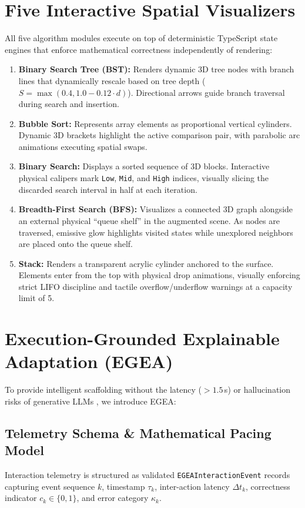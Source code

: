 \documentclass[conference]{IEEEtran}
\begin{document}
\section{Five Interactive Spatial Visualizers}
All five algorithm modules execute on top of deterministic TypeScript state engines that enforce mathematical correctness independently of rendering:
\begin{enumerate}
    \item \textbf{Binary Search Tree (BST):} Renders dynamic 3D tree nodes with branch lines that dynamically rescale based on tree depth ($S = \max(0.4, 1.0 - 0.12 \cdot d)$). Directional arrows guide branch traversal during search and insertion.
    \item \textbf{Bubble Sort:} Represents array elements as proportional vertical cylinders. Dynamic 3D brackets highlight the active comparison pair, with parabolic arc animations executing spatial swaps.
    \item \textbf{Binary Search:} Displays a sorted sequence of 3D blocks. Interactive physical calipers mark \texttt{Low}, \texttt{Mid}, and \texttt{High} indices, visually slicing the discarded search interval in half at each iteration.
    \item \textbf{Breadth-First Search (BFS):} Visualizes a connected 3D graph alongside an external physical ``queue shelf'' in the augmented scene. As nodes are traversed, emissive glow highlights visited states while unexplored neighbors are placed onto the queue shelf.
    \item \textbf{Stack:} Renders a transparent acrylic cylinder anchored to the surface. Elements enter from the top with physical drop animations, visually enforcing strict LIFO discipline and tactile overflow/underflow warnings at a capacity limit of 5.
\end{enumerate}

\section{Execution-Grounded Explainable Adaptation (EGEA)}
To provide intelligent scaffolding without the latency ($> 1.5$\,s) or hallucination risks of generative LLMs \cite{denny2023conversing}, we introduce EGEA:

\subsection{Telemetry Schema \& Mathematical Pacing Model}
Interaction telemetry is structured as validated \texttt{EGEAInteractionEvent} records capturing event sequence $k$, timestamp $\tau_k$, inter-action latency $\Delta t_k$, correctness indicator $c_k \in \{0, 1\}$, and error category $\kappa_k$.
\end{document}
